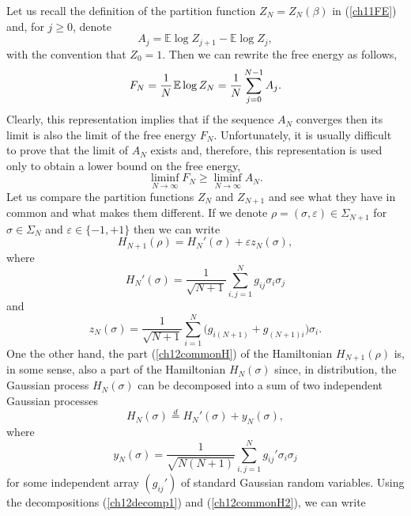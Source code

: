 \documentclass[12pt]{article}
\newcommand{\eps}{{\varepsilon}}
\newcommand{\smsp}{\hspace{0.3mm}}
\newcommand{\e}{\mathbb{E}}
\theoremstyle{nonumberplain}
\begin{document}
Let us recall the definition of the partition function $Z_N=Z_N(\beta)$ in (\ref{ch11FE}) and, for $j\geq 0$, denote 
\begin{equation}
A_j = \e \log Z_{j+1} - \e \log Z_{j},
\end{equation}
with the convention that $Z_0 = 1$. Then we can rewrite the free energy as follows,
\begin{equation}
F_N = \frac{1}{N}\smsp \e \log Z_N
= \frac{1}{N} \sum_{j=0}^{N-1} A_j.
\label{ch12AS2liminf}
\end{equation}
Clearly, this representation implies that if the sequence $A_N$ converges then its limit is also the limit of the free energy $F_N$. Unfortunately, it is usually difficult to prove that the limit of $A_N$ exists and, therefore, this representation is used only to obtain a lower bound on the free energy, 
\begin{equation}
\liminf_{N\to\infty} F_N \geq \liminf_{N\to\infty} A_N.
\label{FNAN}
\end{equation}
Let us compare the partition functions $Z_N$ and $Z_{N+1}$ and see what they have in common and what makes them different. If we denote $\rho = (\sigma,\eps)\in \Sigma_{N+1}$ for $\sigma\in\Sigma_N$ and $\eps\in\{-1,+1\}$ then we can write
\begin{equation}
H_{N+1}(\rho) = H_N'(\sigma) + \eps z_N(\sigma),
\label{ch12decomp1}
\end{equation}
where
\begin{equation}
H_N'(\sigma) = \frac{1}{\sqrt{N+1}} \sum_{i,j =1}^N g_{ij}\sigma_i \sigma_j
\label{ch12commonH}
\end{equation}
and
\begin{equation}
z_N(\sigma) =  \frac{1}{\sqrt{N+1}} \sum_{i=1}^N \bigl(g_{i(N+1)} + g_{(N+1)i} \bigr)\sigma_i. 
\end{equation}
One the other hand, the part (\ref{ch12commonH}) of the Hamiltonian $H_{N+1}(\rho)$ is, in some sense, also a part of the Hamiltonian $H_N(\sigma)$ since, in distribution, the Gaussian process $H_N(\sigma)$ can be decomposed into a sum of two independent Gaussian processes
\begin{equation}
H_N(\sigma) \stackrel{d}{=}
H_N'(\sigma) + y_N(\sigma),
\label{ch12commonH2}
\end{equation}
where
\begin{equation}
y_N(\sigma) = 
 \frac{1}{\sqrt{N(N+1)}} \sum_{i,j =1}^N g_{ij}'\sigma_i \sigma_j
\end{equation}
for some independent array $(g_{ij}')$ of standard Gaussian random variables. Using the decompositions (\ref{ch12decomp1}) and (\ref{ch12commonH2}), we can write
\end{document}

